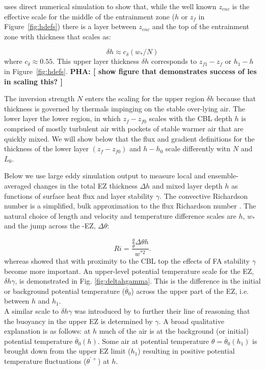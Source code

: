 \documentclass[referee]{svjour3}
\newcommand{\remarkpha}[1]{{ \bf PHA:  [ \footnotesize #1 ]}}
\begin{document}
\cite{Garcia14} uses direct numerical simulation to show that, while the well known $z_{enc}$ is the effective scale for the middle of the entrainment zone ($h$ or $z_f$ in Figure~\ref{fig:hdefs}) there is a layer between $z_{enc}$ and the top of the entrainment zone with thickness that scales as:

\begin{equation}
  \label{eq:upper}
  \delta h \approx c_\delta (w_* / N )
\end{equation}
where $c_\delta \approx 0.55$.  This upper layer thickness $\delta h$ corresponds to  $z_{f1} - z_f$ or $h_1 - h$ in Figure~\ref{fig:hdefs}.
\remarkpha{show figure that demonstrates success of les in scaling this?}

The inversion strength $N$  enters the scaling for the upper region $\delta h$ because that thickness is governed by thermals impinging on the stable over-lying air.  
The lower layer the lower region, in which $z_f - z_{f0}$ scales with the CBL depth $h$  is comprised of mostly turbulent air with pockets of stable warmer air that are quickly mixed. 
We will show below that the flux and gradient definitions for the thickness of the lower layer $(z_{f} - z_{f0})$ and $h - h_0$ scale differently witn $N$ and $L_0$.

Below we use large eddy simulation output to measure local and ensemble-averaged changes in the total EZ thickness $\Delta h$ and mixed layer depth $h$ as functions of surface heat flux and layer stability $\gamma$.  The convective Richardson number is a simplified, bulk approximation to the flux Richardson number \citep{Stull-BLMetIntro}.  The natural choice of length and velocity and temperature difference scales are $h$, $w_{*}$ and the jump across the -EZ, $\Delta \theta$:

\begin{equation}
Ri = \frac{\frac{g}{\overline{\theta}} \Delta \theta h}{w^{*2}}.
\end{equation}
whereas \cite{Sorbjan1} showed that with proximity to the CBL top the effects of FA stability $\gamma$ become more important.  An upper-level potential temperature scale for the EZ, $\delta h \gamma$, is demonstrated in Fig. \ref{fig:deltahgamma}. This is the difference in the initial or background potential temperature ($\overline{\theta}_{0}$) across the upper part of the EZ, i.e. between $h$ and $h_{1}$.\\      

A similar scale to $\delta h \gamma$ was introduced by \cite{Garcia14} to further their line of reasoning that the buoyancy in the upper EZ is determined by $\gamma$. A broad qualitative explanation is as follows: at $h$ much of the air is at the background (or initial) potential temperature $\overline{\theta}_{0}(h)$.  Some air at potential temperature $\theta = \overline{\theta}_{0}(h_{1})$ is brought down from the upper EZ limit ($h_{1}$) resulting in positive potential temperature fluctuations ($\theta^{'+}$) at $h$.\\
\end{document}
